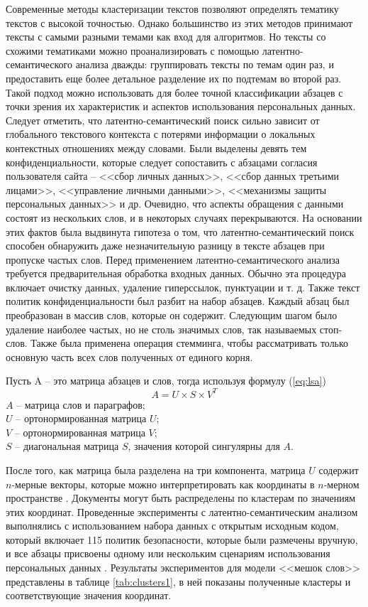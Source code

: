 \documentclass[../main]{subfiles}
\begin{document}
Современные методы кластеризации текстов позволяют определять тематику текстов с высокой точностью. Однако большинство из этих методов принимают тексты с самыми разными темами как вход для алгоритмов. Но тексты со схожими тематиками можно проанализировать с помощью ла\-тен\-тно-семантического анализа дважды: группировать тексты по темам один раз, и предоставить еще более детальное разделение их по подтемам во второй раз. Такой подход можно использовать для более точной классификации абзацев с точки зрения их характеристик и аспектов использования персональных данных. Следует отметить, что латентно-семантический поиск сильно зависит от глобального текстового контекста с потерями информации о локальных контекстных отношениях между словами. Были выделены девять тем конфиденциальности, которые следует сопоставить с абзацами согласия пользователя сайта -- <<сбор личных данных>>, <<сбор данных третьими лицами>>, <<управление личными данными>>, <<механизмы защиты персональных данных>> и др. Очевидно, что аспекты обращения с данными состоят из нескольких слов, и в некоторых случаях перекрываются. На основании этих фактов была выдвинута гипотеза о том, что латентно-семантический поиск способен обнаружить даже незначительную разницу в тексте абзацев при пропуске частых слов. Перед применением латентно-семантического анализа требуется предварительная обработка входных данных. Обычно эта процедура включает очистку данных, удаление гиперссылок, пунктуации и т. д. Также текст политик конфиденциальности был разбит на набор абзацев. Каждый абзац был преобразован в массив слов, которые он содержит. Следующим шагом было удаление наиболее частых, но не столь значимых слов, так называемых стоп-слов. Также была применена операция стемминга, чтобы рассматривать только основную часть всех слов полученных от единого корня.

Пусть A -- это матрица абзацев и слов, тогда используя формулу (\ref{eq:lsa})
\begin{equation}
    \label{eq:lsa}
    A = U \times S \times V^T
\end{equation}
$A$ -- матрица слов и параграфов;\\
\makebox[12.5mm]{\hfill}$U$ -- ортонормированная матрица $U$;\\
\makebox[12.5mm]{\hfill}$V$ -- ортонормированная матрица $V$;\\
\makebox[12.5mm]{\hfill}$S$ -- диагональная матрица $S$, значения которой сингулярны для $A$.

После того, как матрица была разделена на три компонента, матрица $U$ содержит $n$-мерные векторы, которые можно интерпретировать как координаты в $n$-мерном пространстве \cite{LSA}. Документы могут быть распределены по кластерам по значениям этих координат. Проведенные эксперименты с латентно-семантическим анализом выполнялись с использованием набора данных с открытым исходным кодом, который включает 115 политик безопасности, которые были размечены вручную, и все абзацы присвоены одному или нескольким сценариям использования персональных данных \cite{OPP}. Результаты экспериментов для модели <<мешок слов>> представлены в таблице \ref{tab:clusters1}, в ней показаны полученные кластеры и соответствующие значения координат.
\end{document}
